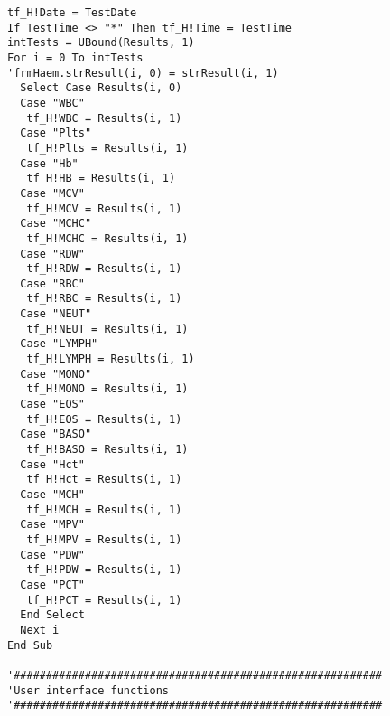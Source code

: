 \begin{lstlisting}
tf_H!Date = TestDate
If TestTime <> "*" Then tf_H!Time = TestTime
intTests = UBound(Results, 1)
For i = 0 To intTests
'frmHaem.strResult(i, 0) = strResult(i, 1)
  Select Case Results(i, 0)
  Case "WBC"
   tf_H!WBC = Results(i, 1)
  Case "Plts"
   tf_H!Plts = Results(i, 1)
  Case "Hb"
   tf_H!HB = Results(i, 1)
  Case "MCV"
   tf_H!MCV = Results(i, 1)
  Case "MCHC"
   tf_H!MCHC = Results(i, 1)
  Case "RDW"
   tf_H!RDW = Results(i, 1)
  Case "RBC"
   tf_H!RBC = Results(i, 1)
  Case "NEUT"
   tf_H!NEUT = Results(i, 1)
  Case "LYMPH"
   tf_H!LYMPH = Results(i, 1)
  Case "MONO"
   tf_H!MONO = Results(i, 1)
  Case "EOS"
   tf_H!EOS = Results(i, 1)
  Case "BASO"
   tf_H!BASO = Results(i, 1)
  Case "Hct"
   tf_H!Hct = Results(i, 1)
  Case "MCH"
   tf_H!MCH = Results(i, 1)
  Case "MPV"
   tf_H!MPV = Results(i, 1)
  Case "PDW"
   tf_H!PDW = Results(i, 1)
  Case "PCT"
   tf_H!PCT = Results(i, 1)
  End Select
  Next i
End Sub

'#########################################################
'User interface functions
'#########################################################


\end{lstlisting}
